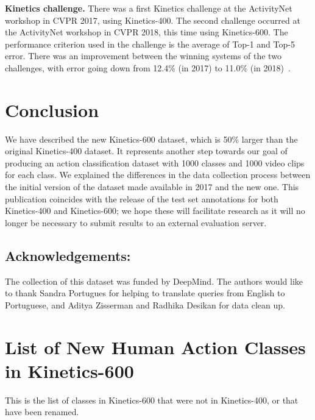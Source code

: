 \documentclass[10pt,twocolumn,letterpaper]{article}
\begin{document}
\vspace{3mm}
\noindent \textbf{Kinetics challenge.} 
There was a first Kinetics challenge at the ActivityNet workshop in
CVPR 2017, using Kinetics-400. The second challenge occurred at the
ActivityNet workshop in CVPR 2018, this time using Kinetics-600. The
performance criterion used in the challenge is the average of Top-1
and Top-5 error. There was an  improvement between the winning systems
of the two challenges, with error going down from 12.4\% (in 2017) to 11.0\% 
(in 2018)~\cite{bian2017revisiting,he2018exploiting}. 


\section{Conclusion}
\label{sec:conclusion}

We have described the new Kinetics-600 dataset, which is 50\% larger
than the original Kinetics-400 dataset.  It represents another step
towards our goal of producing an action classification dataset with
1000 classes and 1000 video clips for each class. We explained the differences in
the data collection process between the initial version of the dataset
made available in 2017 and the new one. This publication coincides
with the release of the test set annotations for both Kinetics-400 and
Kinetics-600; we hope these will facilitate research as it will no
longer be necessary to submit results to an external evaluation
server.

\subsection*{Acknowledgements:} The collection of this dataset was funded by DeepMind. The authors would like to thank Sandra Portugues for helping to translate queries from English to Portuguese, and Aditya Zisserman and Radhika Desikan for data clean up.


{\small


}



\appendix

\section{List of New Human Action Classes in Kinetics-600}
This is the list of classes in Kinetics-600 that were not in Kinetics-400,  or that have been renamed.
\end{document}
